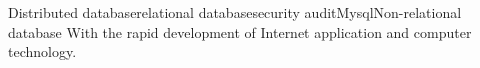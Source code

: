 
\begin{Eabstract}{Distributed database}{relational database}{security audit}{Mysql}{Non-relational database}
With the rapid development of Internet application and computer technology.
\end{Eabstract}
